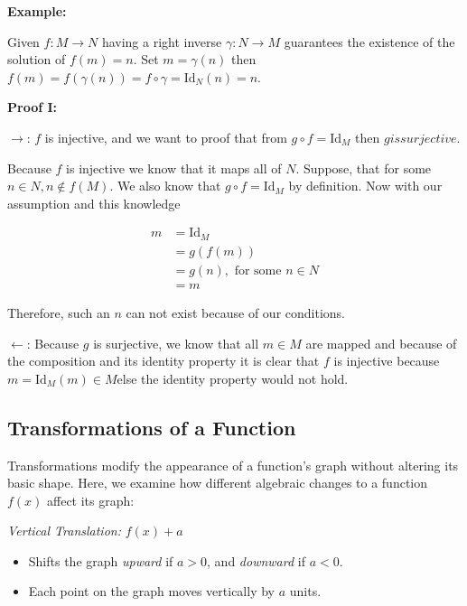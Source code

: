 \textbf{Example:}

Given \(f: M \to N\) having a right inverse \(\gamma: N \to M\) guarantees the existence of the solution of \(f(m) = n\). Set \(m = \gamma(n)\) then 
\(f(m) = f(\gamma(n)) = f \circ \gamma = \text{Id}_N (n) = n\).

\textbf{Proof I:}

\(\rightarrow\): \(f\) is injective, and we want to proof that from \(g \circ f = \text{Id}_M\) then \(g is surjective\).

Because \(f\) is injective we know that it maps all of \(N\). Suppose, that for some \(n \in N, n \notin f(M)\). We also know that 
\(g \circ f = \text{Id}_M\) by definition. Now with our assumption and this knowledge 

\begin{align*}
	m &= \text{Id}_M \\ 
	  &= g(f(m)) \\ 
	  &= g(n), \text{ for some } n \in N \\ 
	  &= m
\end{align*}

Therefore, such an \(n\) can not exist because of our conditions.

\(\leftarrow\): Because \(g\) is surjective, we know that all \(m \in M\) are mapped and because of 
the composition and its identity property it is clear that \(f\) is injective because \(m = \text{Id}_M (m) \in M\)else the identity property would not hold.

\subsection{Transformations of a Function}

Transformations modify the appearance of a function's graph without altering its basic shape.
Here, we examine how different algebraic changes to a function \( f(x) \) affect its graph:

\emph{Vertical Translation:} \( f(x) + a \)
	    
\begin{itemize}
	
	\item Shifts the graph \emph{upward} if \( a > 0 \), and \emph{downward} if \( a < 0 \).
	
	\item Each point on the graph moves vertically by \(a\) units.

\end{itemize}

